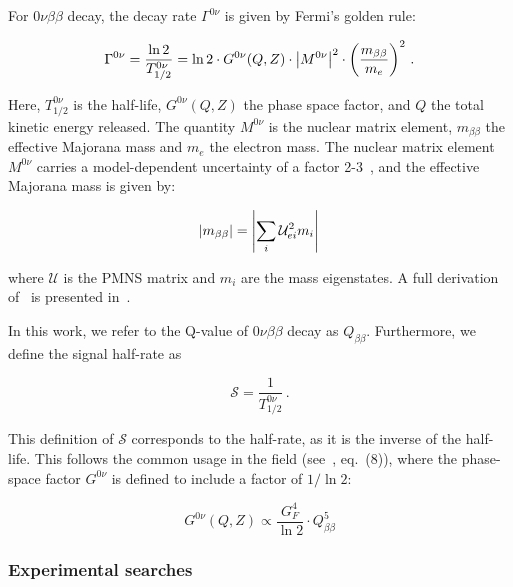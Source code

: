 For $0 \nu \beta \beta$ decay, the decay rate $\Gamma^{0 \nu}$ is given by Fermi's golden rule:

\begin{equation} \label{eq:0vbb_halflife}
	\Gamma^{0 \nu} = \frac{\ln 2}{T^{0 \nu}_{1/2}} = \ln 2 \cdot G^{0 \nu}(Q, Z) \cdot \abs{M^{0 \nu}}^2 \cdot \left( \frac{m_{\beta \beta}}{m_e} \right)^2 \,.
\end{equation}

Here, $T^{0 \nu}_{1/2}$ is the half-life, $G^{0 \nu} (Q,Z)$ the phase space factor, and $Q$ the total kinetic energy released. The quantity $M^{0 \nu}$ is the nuclear matrix element, $m_{\beta \beta}$ the effective Majorana mass and $m_e$ the electron mass. The nuclear matrix element $M^{0 \nu}$ carries a model-dependent uncertainty of a factor 2-3~\cite{engel_status_2017}, and the effective Majorana mass is given by:

\begin{equation}
\label{eq:effective_majorana_mass}
    \abs{m_{\beta \beta}} = \abs{\sum_i \mathcal{U}_{ei} ^2m_i} \,
\end{equation}

\noindent where $\mathcal{U}$ is the PMNS matrix and $m_i$ are the mass eigenstates. A full derivation of~ is presented in~\cite{bilenky_neutrinoless_2015}. 

In this work, we refer to the Q-value of $0 \nu \beta \beta$ decay as $Q_{\beta \beta}$. Furthermore, we define the signal half-rate as

\begin{equation}
\label{eq:signal_half_rate}
    \mathcal{S} = \frac{1}{T^{0 \nu}_{1/2}} \,.
\end{equation}

\noindent This definition of $\mathcal{S}$ corresponds to the half-rate, as it is the inverse of the half-life. This follows the common usage in the field (see~\cite{lnote_25001}, eq.~(8)), where the phase-space factor $G^{0 \nu}$ is defined to include a factor of $1/\ln 2$:

\begin{equation}
\label{eq:0vbb_phase_space}
    G^{0 \nu}(Q,Z) \propto \frac{G_F^4}{\ln 2} \cdot Q_{\beta \beta}^5
\end{equation}


\subsubsection{Experimental searches}

